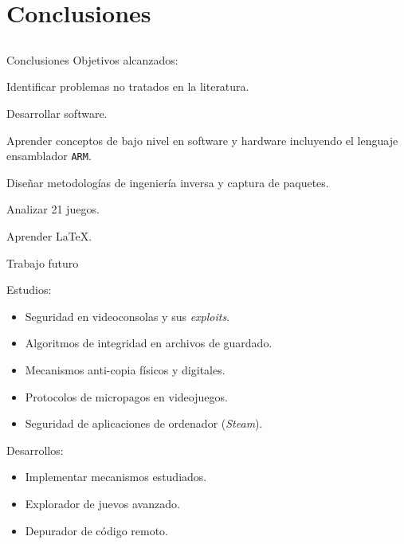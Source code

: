 
\section{Conclusiones}
\subsection{}

\begin{frame}{Conclusiones}
Objetivos alcanzados:
\begin{wideitemize}
    \item<+-> Identificar problemas no tratados en la literatura.

    \item<+-> Desarrollar software.

    \item<+-> Aprender conceptos de bajo nivel en software y hardware incluyendo el lenguaje ensamblador \texttt{ARM}.

    \item<+-> Diseñar metodologías de ingeniería inversa y captura de paquetes.

    \item<+-> Analizar 21 juegos.

    \item<+-> Aprender \LaTeX.
\end{wideitemize}
\end{frame}

\begin{frame}{Trabajo futuro}
\begin{wideitemize}
    \item<+-> Estudios:
    \begin{itemize}
        \item<+-> Seguridad en videoconsolas y sus \textit{exploits}.
        \item<+-> Algoritmos de integridad en archivos de guardado.
        \item<+-> Mecanismos anti-copia físicos y digitales.
        \item<+-> Protocolos de micropagos en videojuegos.
        \item<+-> Seguridad de aplicaciones de ordenador (\textit{Steam}).
    \end{itemize}

    \item<+-> Desarrollos:
    \begin{itemize}
        \item<+-> Implementar mecanismos estudiados.
        \item<+-> Explorador de juevos avanzado.
        \item<+-> Depurador de código remoto.
    \end{itemize}
\end{wideitemize}
\end{frame}
